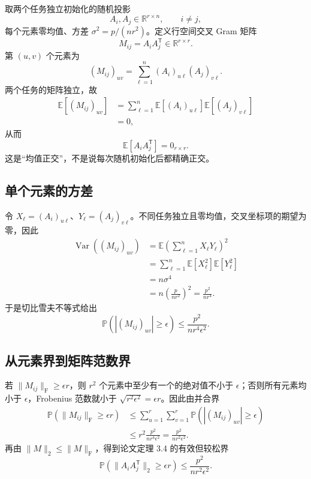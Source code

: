 \documentclass[11pt]{article}
\numberwithin{equation}{section}
\newcommand{\R}{\mathbb{R}}
\newcommand{\E}{\mathbb{E}}
\newcommand{\Pp}{\mathbb{P}}
\newcommand{\1}{\mathbf{1}}
\newcommand{\F}{\mathrm{F}}
\newcommand{\Var}{\operatorname{Var}}
\begin{document}
取两个任务独立初始化的随机投影
\begin{equation}
  A_i,A_j\in\R^{r\times n},
  \qquad i\ne j,
\end{equation}
每个元素零均值、方差 $\sigma^2=p/(nr^2)$。定义行空间交叉 Gram 矩阵
\begin{equation}
  M_{ij}=A_iA_j^{\mathsf{T}}\in\R^{r\times r}.
\end{equation}
第 $(u,v)$ 个元素为
\begin{equation}
  (M_{ij})_{uv}
  =\sum_{\ell=1}^{n}(A_i)_{u\ell}(A_j)_{v\ell}.
\end{equation}
两个任务的矩阵独立，故
\begin{align}
  \E[(M_{ij})_{uv}]
  &=\sum_{\ell=1}^{n}
    \E[(A_i)_{u\ell}]
    \E[(A_j)_{v\ell}]\\
  &=0,
\end{align}
从而
\begin{equation}
  \boxed{\E[A_iA_j^{\mathsf{T}}]=0_{r\times r}.}
  \label{eq:mean-orthogonality}
\end{equation}
这是“均值正交”，不是说每次随机初始化后都精确正交。

\subsection{单个元素的方差}

令 $X_\ell=(A_i)_{u\ell}$、$Y_\ell=(A_j)_{v\ell}$。不同任务独立且零均值，交叉坐标项的期望为零，因此
\begin{align}
  \Var((M_{ij})_{uv})
  &=\E\left(\sum_{\ell=1}^{n}X_\ell Y_\ell\right)^2\\
  &=\sum_{\ell=1}^{n}\E[X_\ell^2]\E[Y_\ell^2]\\
  &=n\sigma^4\\
  &=n\left(\frac{p}{nr^2}\right)^2
  =\frac{p^2}{nr^4}.
  \label{eq:cross-entry-var}
\end{align}
于是切比雪夫不等式给出
\begin{equation}
  \Pp\left(|(M_{ij})_{uv}|\ge\epsilon\right)
  \le\frac{p^2}{nr^4\epsilon^2}.
  \label{eq:entry-cheb}
\end{equation}

\subsection{从元素界到矩阵范数界}

若 $\|M_{ij}\|_\F\ge\epsilon r$，则 $r^2$ 个元素中至少有一个的绝对值不小于 $\epsilon$；否则所有元素均小于 $\epsilon$，Frobenius 范数就小于 $\sqrt{r^2\epsilon^2}=\epsilon r$。因此由并合界
\begin{align}
  \Pp(\|M_{ij}\|_\F\ge\epsilon r)
  &\le\sum_{u=1}^{r}\sum_{v=1}^{r}
  \Pp(|(M_{ij})_{uv}|\ge\epsilon)\\
  &\le r^2\frac{p^2}{nr^4\epsilon^2}
  =\frac{p^2}{nr^2\epsilon^2}.
  \label{eq:paper-union-bound}
\end{align}
再由 $\|M\|_2\le\|M\|_\F$，得到论文定理 3.4 的有效但较松界
\begin{equation}
  \boxed{
  \Pp(\|A_iA_j^{\mathsf{T}}\|_2\ge\epsilon r)
  \le\frac{p^2}{nr^2\epsilon^2}.}
  \label{eq:paper-orth-bound}
\end{equation}
\end{document}
